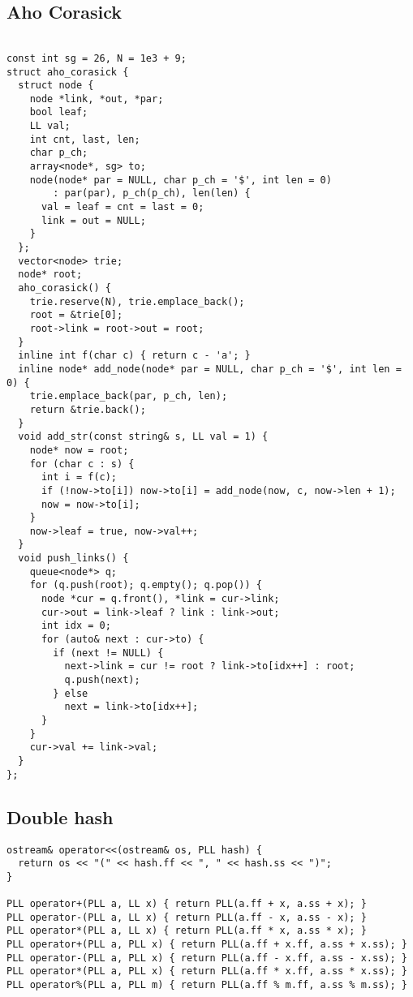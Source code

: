 \documentclass[FSZ,a4paper,onesided]{article}
\begin{document}
\begin{multicols*}{\COLS}
\subsection{Aho Corasick}
\begin{lstlisting}

const int sg = 26, N = 1e3 + 9;
struct aho_corasick {
  struct node {
    node *link, *out, *par;
    bool leaf;
    LL val;
    int cnt, last, len;
    char p_ch;
    array<node*, sg> to;
    node(node* par = NULL, char p_ch = '$', int len = 0)
        : par(par), p_ch(p_ch), len(len) {
      val = leaf = cnt = last = 0;
      link = out = NULL;
    }
  };
  vector<node> trie;
  node* root;
  aho_corasick() {
    trie.reserve(N), trie.emplace_back();
    root = &trie[0];
    root->link = root->out = root;
  }
  inline int f(char c) { return c - 'a'; }
  inline node* add_node(node* par = NULL, char p_ch = '$', int len = 0) {
    trie.emplace_back(par, p_ch, len);
    return &trie.back();
  }
  void add_str(const string& s, LL val = 1) {
    node* now = root;
    for (char c : s) {
      int i = f(c);
      if (!now->to[i]) now->to[i] = add_node(now, c, now->len + 1);
      now = now->to[i];
    }
    now->leaf = true, now->val++;
  }
  void push_links() {
    queue<node*> q;
    for (q.push(root); q.empty(); q.pop()) {
      node *cur = q.front(), *link = cur->link;
      cur->out = link->leaf ? link : link->out;
      int idx = 0;
      for (auto& next : cur->to) {
        if (next != NULL) {
          next->link = cur != root ? link->to[idx++] : root;
          q.push(next);
        } else
          next = link->to[idx++];
      }
    }
    cur->val += link->val;
  }
};
\end{lstlisting}
\subsection{Double hash}
\begin{lstlisting}
ostream& operator<<(ostream& os, PLL hash) {
  return os << "(" << hash.ff << ", " << hash.ss << ")";
}

PLL operator+(PLL a, LL x) { return PLL(a.ff + x, a.ss + x); }
PLL operator-(PLL a, LL x) { return PLL(a.ff - x, a.ss - x); }
PLL operator*(PLL a, LL x) { return PLL(a.ff * x, a.ss * x); }
PLL operator+(PLL a, PLL x) { return PLL(a.ff + x.ff, a.ss + x.ss); }
PLL operator-(PLL a, PLL x) { return PLL(a.ff - x.ff, a.ss - x.ss); }
PLL operator*(PLL a, PLL x) { return PLL(a.ff * x.ff, a.ss * x.ss); }
PLL operator%(PLL a, PLL m) { return PLL(a.ff % m.ff, a.ss % m.ss); }


\end{lstlisting}
\end{multicols*}
\end{document}
